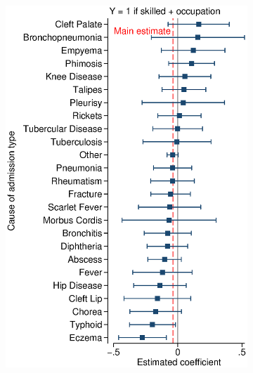 \documentclass[12pt,english]{article}
\begin{document}
\begin{figure}[!ht]
\begin{subfigure}{0.325\textwidth}
	\includegraphics[width=1.00\linewidth]{../output/02_appendix/figure_a09_panel_4.eps}
\end{subfigure}
\begin{subfigure}{0.325\textwidth}
	\centering

\end{subfigure}
\end{figure}
\end{document}

